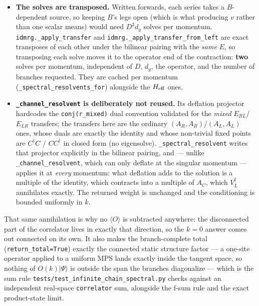 \documentclass[11pt]{article}
\begin{document}
\begin{itemize}
\item \textbf{The solves are transposed.} Written forwards, each series
takes a $B$-dependent source, so keeping $B$'s legs open (which is what
producing $v$ rather than one scalar means) would need $D^2 d_g$ solves
per momentum. \texttt{idmrg.\_apply\_transfer} and
\texttt{idmrg.\_apply\_transfer\_from\_left} are exact transposes of each
other under the bilinear pairing with the \emph{same} $E$, so transposing
each solve moves it to the operator end of the contraction:
\textbf{two} solves per momentum, independent of $D$, $d_g$, the operator,
and the number of branches requested. They are cached per momentum
(\texttt{\_spectral\_resolvents\_for}) alongside the $H_{\rm eff}$ ones.
\item \textbf{\texttt{\_channel\_resolvent} is deliberately not reused.}
Its deflation projector hardcodes the \texttt{conj(r\_mixed)} dual
convention validated for the \emph{mixed} $E_{RL}$/$E_{LR}$ transfers;
the transfers here are the ordinary $(A_R,A_R)$/$(A_L,A_L)$ ones, whose
duals are exactly the identity and whose non-trivial fixed points are
$C^\dagger C$ / $C C^\dagger$ in closed form (no eigensolve).
\texttt{\_spectral\_resolvent} writes that projector explicitly in the
bilinear pairing, and --- unlike \texttt{\_channel\_resolvent}, which can
only deflate at the singular momentum --- applies it at \emph{every}
momentum: what deflation adds to the solution is a multiple of the
identity, which contracts into a multiple of $A_C$, which $V_L^\dagger$
annihilates exactly. The returned weight is unchanged and the
conditioning is bounded uniformly in $k$.
\end{itemize}

That same annihilation is why no $\langle O\rangle$ is subtracted
anywhere: the disconnected part of the correlator lives in exactly that
direction, so the $k=0$ answer comes out connected on its own. It also
makes the branch-complete total (\texttt{return\_total=True}) exactly the
connected static structure factor --- a one-site operator applied to a
uniform MPS lands exactly inside the tangent space, so nothing of
$O(k)|\Psi\rangle$ is outside the span the branches diagonalize --- which
is the sum rule \texttt{tests/test\_infinite\_chain\_spectral.py} checks
against an independent real-space \texttt{correlator} sum, alongside the
f-sum rule and the exact product-state limit.
\end{document}
